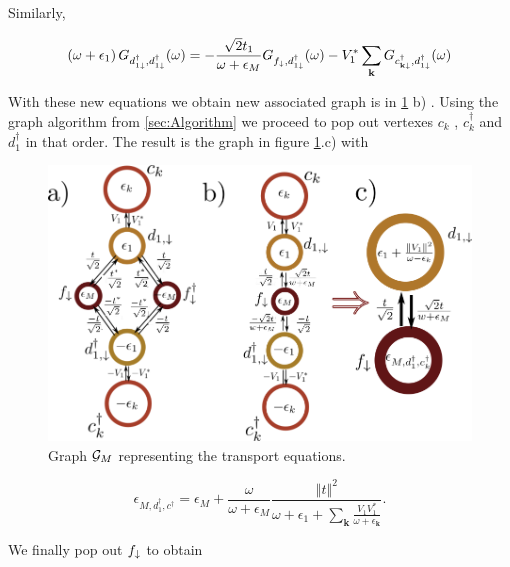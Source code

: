 Similarly, 

\begin{equation}
    \left(\omega+\epsilon_{1}\right)G_{d_{1\downarrow}^{\dagger},d_{1\downarrow}^{\dagger}}(\omega)=-\frac{\sqrt{2}t_{1}}{\omega+\epsilon_{M}}G_{f_{\downarrow},d_{1\downarrow}^{\dagger}}(\omega)-V_{1}^{*}\sum_{\mathbf{k}}G_{c_{\mathbf{k\downarrow}}^{\dagger},d_{1\downarrow}^{\dagger}}(\omega)
\end{equation} 
 
 
 With these new equations we obtain new associated graph is  in \ref{fig:green-M-QD} b) .  Using the graph algorithm from \ref{sec:Algorithm}  we proceed to pop out vertexes $c_k$ , $c_k^\dagger$ and $d_1^\dagger$ in that order. The result is the graph in figure \ref{fig:green-M-QD}.c) with 
 
 \begin{figure}[t]
    \centering
    \includegraphics[scale=0.5]{IMAGES/Graphs/Grenn-Majorana.png}
    \caption{ Graph $\mathcal{G}_M$ representing the transport equations.  \label{fig:green-M-QD} \protect{}}
\end{figure}
 
 \begin{equation}
    \epsilon_{M,d_1^\dagger,c^\dagger}= \epsilon_{M}+\frac{\omega}{\omega+\epsilon_{M}}\frac{\left\Vert t\right\Vert ^{2}}{\omega+\epsilon_{1}+\sum_{\mathbf{k}}\frac{V_{1}V_{1}^{*}}{\omega+\epsilon_{\mathbf{k}}}}.
\end{equation}
 
 We finally pop out $f_\downarrow$ to obtain 
 
